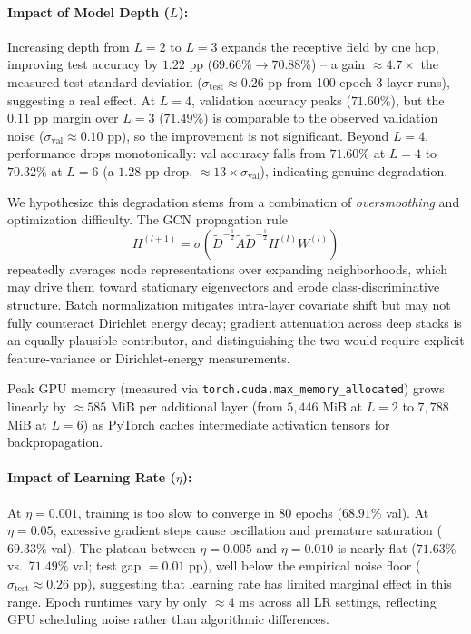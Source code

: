 \documentclass[10pt,twocolumn]{article}
\begin{document}
\paragraph{Impact of Model Depth ($L$):}
Increasing depth from $L=2$ to $L=3$ expands the receptive field by one hop,
improving test accuracy by $1.22$ pp ($69.66\%{\to}70.88\%$) -- a gain
${\approx}4.7{\times}$ the measured test standard deviation ($\sigma_{\text{test}}
\approx 0.26$ pp from 100-epoch 3-layer runs), suggesting a real effect.
At $L=4$, validation accuracy peaks ($71.60\%$), but the $0.11$ pp margin over $L=3$ ($71.49\%$) is comparable
to the observed validation noise ($\sigma_{\text{val}} \approx 0.10$ pp), so the
improvement is not significant.  Beyond $L=4$, performance drops monotonically:
val accuracy falls from $71.60\%$ at $L=4$ to $70.32\%$ at $L=6$ (a $1.28$ pp
drop, ${\approx}13{\times}\sigma_{\text{val}}$), indicating genuine degradation.

We hypothesize this degradation stems from a combination of \emph{oversmoothing}
and optimization difficulty.  The GCN propagation rule
\begin{equation}
  H^{(l+1)} = \sigma\!\left(\tilde{D}^{-\frac{1}{2}}\tilde{A}\tilde{D}^{-\frac{1}{2}}
               H^{(l)} W^{(l)}\right)
  \label{eq:gcn_layer}
\end{equation}
repeatedly averages node representations over expanding neighborhoods, which may
drive them toward stationary eigenvectors and erode class-discriminative structure.
Batch normalization mitigates intra-layer covariate shift but may not fully
counteract Dirichlet energy decay; gradient attenuation across deep stacks is an
equally plausible contributor, and distinguishing the two would require explicit
feature-variance or Dirichlet-energy measurements.

Peak GPU memory (measured via \texttt{torch.cuda.max\_memory\_allocated})
grows linearly by ${\approx}585$ MiB per additional layer (from $5{,}446$ MiB at
$L=2$ to $7{,}788$ MiB at $L=6$) as PyTorch caches intermediate activation
tensors for backpropagation.

\paragraph{Impact of Learning Rate ($\eta$):}
At $\eta=0.001$, training is too slow to converge in 80 epochs ($68.91\%$ val).
At $\eta=0.05$, excessive gradient steps cause oscillation and premature
saturation ($69.33\%$ val).  The plateau between $\eta=0.005$ and $\eta=0.010$
is nearly flat ($71.63\%$ vs.\ $71.49\%$ val; test gap $=0.01$ pp), well below
the empirical noise floor ($\sigma_{\text{test}}\approx 0.26$ pp), suggesting
that learning rate has limited marginal effect in this range.  Epoch runtimes
vary by only $\approx 4$ ms across all LR settings, reflecting GPU scheduling
noise rather than algorithmic differences.
\end{document}
